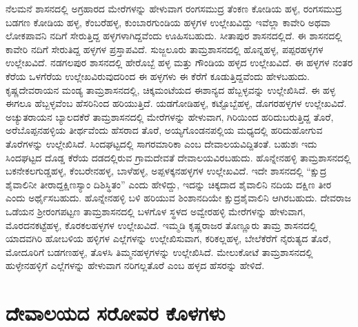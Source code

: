 ನೆಲಮನೆ ಶಾಸನದಲ್ಲಿ ಅಗ್ರಹಾರದ ಮೇರೆಗಳನ್ನು ಹೇಳುವಾಗ ರಂಗಸಮುದ್ರ ತೆಂಕಣ ಕೋಡಿಯ ಹಳ್ಳ, ರಂಗಸಮುದ್ರ ಬಡಗಣ ಕೋಡಿಯ ಹಳ್ಳ, ಕೆಂಬರೆಹಳ್ಳ, ಕುಂಬಾರಗುಂಡಿಯ ಹಳ್ಳಗಳ ಉಲ್ಲೇಖವಿದ್ದು ಇವೆಲ್ಲಾ ಕಾವೇರಿ ಅಥವಾ ಲೋಕಪಾವನಿ ನದಿಗೆ ಸೇರುತ್ತಿದ್ದ ಹಳ್ಳಗಳಾಗಿದ್ದವೆಂದು ಊಹಿಸಬಹುದು. ಸೀತಾಪುರ ಶಾಸನದಲ್ಲಿದೆ. ಈ ಶಾಸನದಲ್ಲಿ ಕಾವೇರಿ ನದಿಗೆ ಸೇರುತಿದ್ದ ಹಳ್ಳಗಳ ಪ್ರಸ್ತಾಪವಿದೆ. ಸುಜ್ಜಲೂರು ತಾಮ್ರಶಾಸನದಲ್ಲಿ ಹೊನ್ನಹಳ್ಳ, ಪಪ್ಪರಹಳ್ಳಗಳ ಉಲ್ಲೇಖವಿದೆ. ನಡಗಲಪುರ ಶಾಸನದಲ್ಲಿ ಹೇರೊಬ್ಬೆ ಹಳ್ಳ ಮತ್ತು ಗೌಂಡಿಯ ಹಳ್ಳದ ಉಲ್ಲೇಖವಿದೆ. ಈ ಹಳ್ಳಗಳ ನಂತರ ಕೆರೆಯ ಒಳಗೆರೆಯ ಉಲ್ಲೇಖವಿರುವುದರಿಂದ ಈ ಹಳ್ಳಗಳು ಈ ಕೆರೆಗೆ ಕೂಡುತ್ತಿದ್ದವೆಂದು ಹೇಳಬಹುದು. ಕೃಷ್ಣದೇವರಾಯನ ಮಂಡ್ಯ ತಾಮ್ರಶಾಸನದಲ್ಲಿ, ಚಿಕ್ಕಮಂಟೆಯದ ಈಶಾನ್ಯದ ಹೆಬ್ಬಳ್ಳವನ್ನು ಉಲ್ಲೇಖಿಸಿದೆ. ಈ ಹಳ್ಳ ಈಗಲೂ ಹೆಬ್ಬಳ್ಳವೆಂಬ ಹೆಸರಿನಿಂದ ಹರಿಯುತ್ತಿದೆ. ಯಡಗೋಡಿಹಳ್ಳ, ಕಟ್ಟೊಬ್ಬೆಹಳ್ಳ, ಡೊಗರಹಳ್ಳಗಳ ಉಲ್ಲೇಖವಿದೆ. ಅಚ್ಯುತರಾಯನ ಬ್ಯಾಲದಕೆರೆ ತಾಮ್ರಶಾಸನದಲ್ಲಿ ಮೇರೆಗಳನ್ನು ಹೇಳುವಾಗ, ಗಿರಿಯಿಂದ ಹರಿದುಬರುತ್ತಿದ್ದ ತೊರೆ, ಅರೆಬೊಪ್ಪನಹಳ್ಳಿಯ ತೀರ್ಥವೆಂದು ಹೆಸರಾದ ತೊರೆ, ಅಯ್ಯಗೊಂಡನಪಲ್ಲಿಯ ಮಧ್ಯದಲ್ಲಿ ಹರಿದುಹೋಗುವ ತೊರೆಗಳನ್ನು ಉಲ್ಲೇಖಿಸಿದೆ. ಸಿಂದಘಟ್ಟದಲ್ಲಿ ಸಾಗರಮಾರಿಕಾ ಎಂಬ ದೇವಾಲಯವಿದ್ದಿತಂತೆ. ಬಹುಶಃ ಇದು ಸಿಂದಘಟ್ಟದ ದೊಡ್ಡ ಕೆರೆಯ ದಡದಲ್ಲಿರುವ ಗ್ರಾಮದೇವತೆ ದೇವಾಲಯವಿರಬಹುದು. ಹೊನ್ನೇನಹಳ್ಳಿ ತಾಮ್ರಶಾಸನದಲ್ಲಿ ಬಕನೇಕಲಗುಡ್ಡಹಳ್ಳ, ಕೆಂಬರೇನಹಳ್ಳ, ಬಾಳೆಹಳ್ಳ, ಅಪ್ಪಳಕ್ಕನಹಳ್ಳಗಳ ಉಲ್ಲೇಖವಿದೆ. ಇದೇ ಶಾಸನದಲ್ಲಿ “ಕ್ಷುದ್ರ ಶೈವಾಲಿನೀ ತೀರಾದ್ದಕ್ಷಿಣಸ್ಯಾಂ ದಿಶಿಸ್ಥಿತಂ” ಎಂದು ಹೇಳಿದ್ದು, ಇದನ್ನು ಚಿಕ್ಕದಾದ ಶೈವಾಲಿನಿ ನದಿಯ ದಕ್ಷಿಣ ತೀರ ಎಂದು ಅರ್ಥೈಸಬಹುದು. ಹೊನ್ನೇನಹಳ್ಳಿ ಬಳಿ ಹರಿಯುವ ಶಿಂಶಾನದಿಯೇ ಕ್ಷುದ್ರಶೈವಾಲಿನಿ ಆಗಿರಬಹುದು. ದೇವರಾಜ ಒಡೆಯನ ಶ‍್ರೀರಂಗಪಟ್ಟಣ ತಾಮ್ರಶಾಸನದಲ್ಲಿ ಬಳಗೊಳ ಸ್ಥಳದ ಅವ್ವೇರಹಳ್ಳಿ ಮೇರೆಗಳನ್ನು ಹೇಳುವಾಗ, ಮೊರದನಕಟ್ಟೆಹಳ್ಳ, ಕೊರಕಲಹಳ್ಳಗಳ ಉಲ್ಲೇಖವಿದೆ. ಇಮ್ಮಡಿ ಕೃಷ್ಣರಾಜರ ತೊಣ್ಣೂರು ತಾಮ್ರ ಶಾಸನದಲ್ಲಿ ಯಾದವಗಿರಿ ಹೋಬಳಿಯ ಹಳ್ಳಿಗಳ ಎಲ್ಲೆಗಳನ್ನು ಉಲ್ಲೇಖಿಸುವಾಗ, ಕರಿಕಲ್ಲಹಳ್ಳ, ಬೇಲೆಕೆರೆಗೆ ನೈರುತ್ಯದ ತೊರೆ, ಮೋದೂರಿಗೆ ಬಡಗಣಹಳ್ಳ, ತೊಳಸಿ ತಿಮ್ಮನಹಳ್ಳಗಳನ್ನು ಉಲ್ಲೇಖಿಸಿದೆ. ಮೇಲುಕೋಟೆ ತಾಮ್ರಶಾಸನದಲ್ಲಿ ಹುಳ್ಳೇನಹಳ್ಳಿಗೆ ಎಲ್ಲೆಗಳನ್ನು ಹೇಳುವಾಗ ನರಿಗಲ್ಲತೊರೆ ಎಂಬ ಹಳ್ಳದ ಹೆಸರನ್ನು ಹೇಳಿದೆ.


\section{ದೇವಾಲಯದ ಸರೋವರ ಕೊಳಗಳು}

